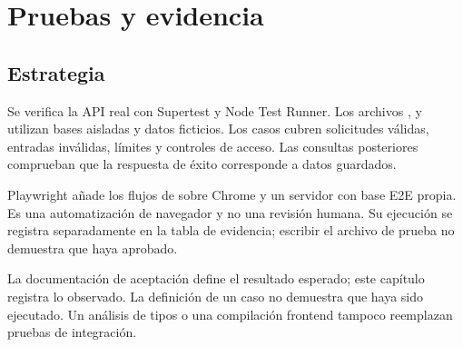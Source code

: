 \chapter{Pruebas y evidencia}
\section{Estrategia}
Se verifica la API real con Supertest y Node Test Runner. Los archivos ,  y  utilizan bases aisladas y datos ficticios. Los casos cubren solicitudes válidas, entradas inválidas, límites y controles de acceso. Las consultas posteriores comprueban que la respuesta de éxito corresponde a datos guardados.

Playwright añade los flujos de  sobre Chrome y un servidor con base E2E propia. Es una automatización de navegador y no una revisión humana. Su ejecución se registra separadamente en la tabla de evidencia; escribir el archivo de prueba no demuestra que haya aprobado.

La documentación de aceptación define el resultado esperado; este capítulo registra lo observado. La definición de un caso no demuestra que haya sido ejecutado. Un análisis de tipos o una compilación frontend tampoco reemplazan pruebas de integración.

